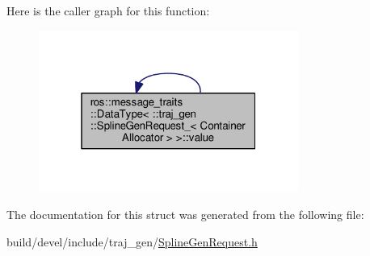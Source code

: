 Here is the caller graph for this function\+:
\nopagebreak
\begin{figure}[H]
\begin{center}
\leavevmode
\includegraphics[width=241pt]{structros_1_1message__traits_1_1_data_type_3_01_1_1traj__gen_1_1_spline_gen_request___3_01_container_allocator_01_4_01_4_a6b0da019adeec8ef9f47f6297c4d8031_icgraph}
\end{center}
\end{figure}




The documentation for this struct was generated from the following file\+:\begin{DoxyCompactItemize}
\item 
build/devel/include/traj\+\_\+gen/\hyperlink{_spline_gen_request_8h}{Spline\+Gen\+Request.\+h}\end{DoxyCompactItemize}
